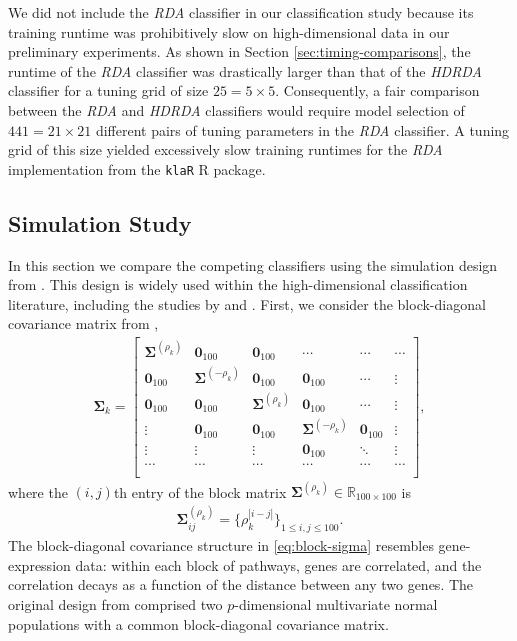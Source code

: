 \documentclass[]{interact}\usepackage[]{graphicx}\usepackage[]{color}
\begin{document}
We did not include the \emph{RDA} classifier in our classification study because
its training runtime was prohibitively slow on high-dimensional data in our
preliminary experiments. As shown in Section \ref{sec:timing-comparisons}, the
runtime of the \emph{RDA} classifier was drastically larger than that of the
\emph{HDRDA} classifier for a tuning grid of size $25 = 5 \times
5$. Consequently, a fair comparison between the \emph{RDA} and \emph{HDRDA}
classifiers would require model selection of $441 = 21 \times 21$ different
pairs of tuning parameters in the \emph{RDA} classifier. A tuning grid of this
size yielded excessively slow training runtimes for the \emph{RDA}
implementation from the {\tt klaR} R package.

\subsection{Simulation Study}

In this section we compare the competing classifiers using the simulation design
from \cite{Guo:2007te}. This design is widely used within the high-dimensional
classification literature, including the studies by \cite{Ramey:2013ji} and
\cite{Witten:2011kc}. First, we consider the block-diagonal covariance matrix
from \cite{Guo:2007te},
\begin{align}
  \bm\Sigma_k = \begin{bmatrix}
    \bm\Sigma^{(\rho_k)} & \bm 0_{100} & \bm 0_{100} & \cdots & \cdots & \cdots \\
    \bm 0_{100} & \bm\Sigma^{(-\rho_k)} & \bm 0_{100} & \bm 0_{100} & \cdots & \vdots \\
    \bm 0_{100} & \bm 0_{100} & \bm\Sigma^{(\rho_k)} & \bm 0_{100} & \cdots & \vdots \\
    \vdots & \bm 0_{100} & \bm 0_{100} & \bm\Sigma^{(-\rho_k)} & \bm 0_{100} & \vdots \\
    \vdots & \vdots & \vdots & \bm 0_{100} & \ddots & \vdots \\
    \cdots & \cdots & \cdots & \cdots & \cdots & \cdots \\
  \end{bmatrix},\label{eq:block-sigma}
\end{align}
where the $(i,j)$th entry of the block matrix $\bm\Sigma^{(\rho_k)} \in
\mathbb{R}_{100 \times 100}$ is
\begin{align*}
\bm\Sigma_{ij}^{(\rho_k)} = \{ \rho_k^{|i - j|} \}_{1 \le i,j \le 100}.
\end{align*}
The block-diagonal covariance structure in \eqref{eq:block-sigma} resembles
gene-expression data: within each block of pathways, genes are correlated, and
the correlation decays as a function of the distance between any two genes. The
original design from \cite{Guo:2007te} comprised two $p$-dimensional
multivariate normal populations with a common block-diagonal covariance matrix.
\end{document}
